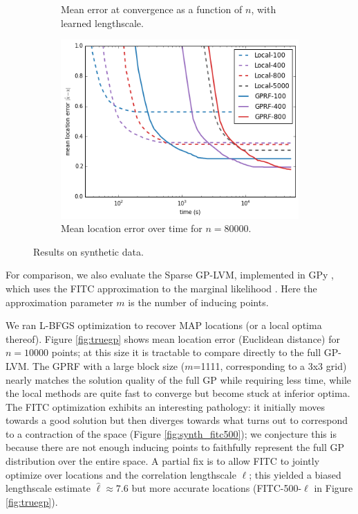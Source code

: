 \documentclass{article}
\begin{document}
\begin{figure}
\begin{subfigure}[t]{.32\textwidth}
                 \caption{Mean error at convergence as a
                   function of $n$, with learned
                   lengthscale.}
                 \label{fig:fitc_lscale}
         \end{subfigure}\hspace{0.5em}
 \begin{subfigure}[t]{.32\textwidth}
                 \includegraphics[width=\textwidth]{eighty_bytime}
                 \caption{Mean location error over time for $n=80000$.}
                 \label{fig:eighty}
         \end{subfigure}
\caption{Results on synthetic data.}
\label{fig:synthresults}
\vspace{-0.5cm}
\end{figure} 

For comparison, we also evaluate the Sparse GP-LVM, implemented in GPy
\cite{gpy2014}, which uses the FITC approximation to the
marginal likelihood \cite{lawrence2007learning}. Here the
approximation parameter $m$ is the number of inducing points. 

We ran L-BFGS optimization to recover MAP
locations (or a local optima thereof). Figure \ref{fig:truegp} shows
mean location error (Euclidean distance) for $n=10000$ points; at this
size it is tractable to compare directly to the full GP-LVM. The GPRF
with a large block size ($m$=1111, corresponding to a 3x3 grid) nearly matches the solution
quality of the full GP while requiring less time, while the local
methods are quite fast to converge but become stuck at inferior
optima. The FITC optimization exhibits an interesting pathology: it
initially moves towards a good solution but then diverges towards what
turns out to correspond to
a contraction of the space (Figure \ref{fig:synth_fitc500}); we
conjecture this is because there are not enough inducing points to
faithfully represent the full GP distribution over the entire space. A
partial fix is to allow FITC to jointly optimize over locations and
the correlation lengthscale $\ell$; this yielded a biased lengthscale
estimate $\hat{\ell} \approx 7.6$ but more accurate
locations (FITC-500-$\ell$ in Figure \ref{fig:truegp}).
\end{document}
